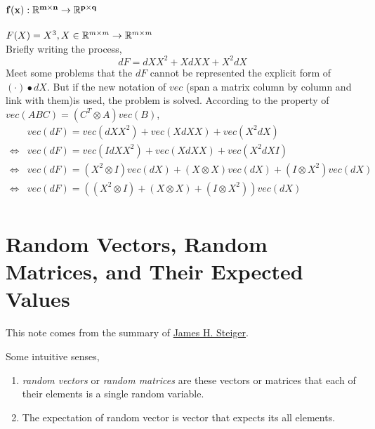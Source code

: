 		\subsubsection{$\mathbf{f(x):\mathbb{R}^{m\times n}\rightarrow\mathbb{R}^{p\times q}}$}
		\begin{Examples}{}{}
			$F(X)=X^3,X\in\mathbb{R}^{m\times m}\rightarrow \mathbb{R}^{m\times m}$\\
			Briefly writing the process,
			$$
			dF = dXX^2+XdXX+X^2dX
			$$
			Meet some problems that the $dF$ cannot be represented the explicit form of $(\cdot) \bullet dX$. But if the new notation of $vec$ (span a matrix column by column and link with them)is used, the problem is solved. According to the property of $vec(ABC)=(C^T\otimes A)vec(B)$,
			\begin{equation*}
			\begin{split}
			&vec(dF)=vec(dXX^2)+vec(XdXX)+vec(X^2dX) \\
			\Leftrightarrow& vec(dF)=vec(IdXX^2)+vec(XdXX)+vec(X^2dXI) \\
			\Leftrightarrow& vec(dF)=(X^2\otimes I)vec(dX)+(X\otimes X)vec(dX)+(I\otimes X^2)vec(dX) \\
			\Leftrightarrow& vec(dF)=((X^2\otimes I)+(X\otimes X)+(I\otimes X^2))vec(dX) \\
			\end{split}
			\end{equation*}
		\end{Examples}
	
	\section{Random Vectors, Random Matrices, and Their Expected Values }
	This note comes from the summary of  \href{http://www.statpower.net/Content/313/Lecture\%20Notes/MatrixExpectedValue.pdf}{James H. Steiger}. 
	
	Some intuitive senses,
	\begin{enumerate}
		\item \emph{random vectors} or \emph{random matrices} are these vectors or matrices that each of their elements is a single random variable.
		\item The expectation of random vector is vector that expects its all elements.
	\end{enumerate} 
	
	
	
